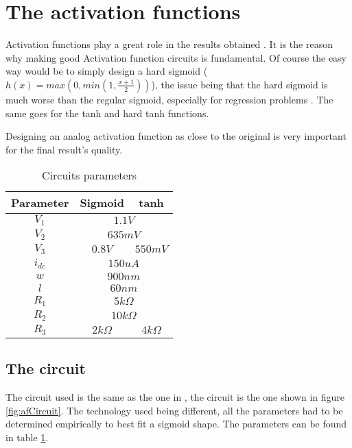 \section{The activation functions}
\label{sec:af}

Activation functions play a great role in the results obtained \cite{af}. It is the reason why making good Activation function circuits is fundamental. Of course the easy way would be to simply design a hard sigmoid ($h(x)=max(0,min(1,\frac{x+1}{2}))$), the issue being that the hard sigmoid is much worse than the regular sigmoid, especially for regression problems \cite{hardSigm}. The same goes for the \ac{tanh} and hard \ac{tanh} functions.

Designing an analog activation function as close to the original is very important for the final result's quality.

\begin{table}[H]
  \centering
  \caption{Circuits parameters}
  \begin{tabular}{|c|c|c|}
    \hline
    \rowcolor{gray}
    Parameter & Sigmoid & \ac{tanh} \\
    \hline
    $V_1$ & \multicolumn{2}{c|}{$1.1V$}\\
    \hline
    $V_2$ & \multicolumn{2}{c|}{$635mV$}\\
    \hline
    $V_3$ & $0.8V$ & $550mV$\\
    \hline
    $i_{dc}$ & \multicolumn{2}{c|}{$150uA$}\\
    \hline
    $w$ & \multicolumn{2}{c|}{$900nm$}\\
    \hline
    $l$ & \multicolumn{2}{c|}{$60nm$}\\
    \hline
    $R_1$ & \multicolumn{2}{c|}{$5k\Omega$}\\
    \hline
    $R_2$ & \multicolumn{2}{c|}{$10k\Omega$}\\
    \hline
    $R_3$ & $2k\Omega$ & $4k\Omega$\\
    \hline
  \end{tabular}
  \label{tab:afPar}
\end{table}

\subsection{The circuit}

The circuit used is the same as the one in \cite{thesisRef}, the circuit is the one shown in figure \ref{fig:afCircuit}. The technology used being different, all the parameters had to be determined empirically to best fit a sigmoid shape. The parameters can be found in table \ref{tab:afPar}.

